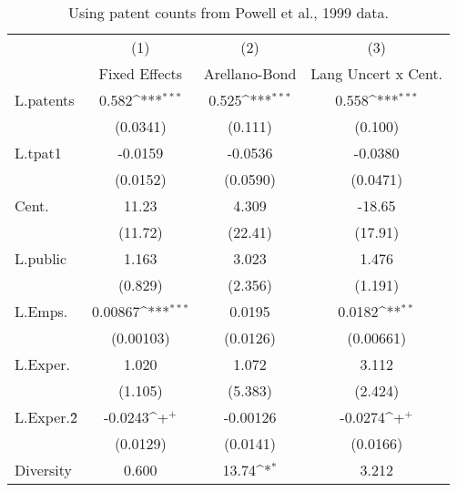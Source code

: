 \begin{table}
\begin{center}
\caption[Alternative Patents Measure]{Using patent counts from Powell et al., 1999 data.\label{altpat}}
\vspace{0.3in}
{
\def\sym#1{\ifmmode^{#1}\else\(^{#1}\)\fi}
\begin{tabular}{l*{3}{c}}
\hline\hline
                    &\multicolumn{1}{c}{(1)}&\multicolumn{1}{c}{(2)}&\multicolumn{1}{c}{(3)}\\
                    &\multicolumn{1}{c}{Fixed Effects}&\multicolumn{1}{c}{Arellano-Bond}&\multicolumn{1}{c}{Lang Uncert x Cent.}\\
\hline
L.patents           &       0.582\sym{***}&       0.525\sym{***}&       0.558\sym{***}\\
                    &    (0.0341)         &     (0.111)         &     (0.100)         \\
L.tpat1             &     -0.0159         &     -0.0536         &     -0.0380         \\
                    &    (0.0152)         &    (0.0590)         &    (0.0471)         \\
Cent.               &       11.23         &       4.309         &      -18.65         \\
                    &     (11.72)         &     (22.41)         &     (17.91)         \\
L.public            &       1.163         &       3.023         &       1.476         \\
                    &     (0.829)         &     (2.356)         &     (1.191)         \\
L.Emps.             &     0.00867\sym{***}&      0.0195         &      0.0182\sym{**} \\
                    &   (0.00103)         &    (0.0126)         &   (0.00661)         \\
L.Exper.            &       1.020         &       1.072         &       3.112         \\
                    &     (1.105)         &     (5.383)         &     (2.424)         \\
L.Exper.\^2         &     -0.0243\sym{+}  &    -0.00126         &     -0.0274\sym{+}  \\
                    &    (0.0129)         &    (0.0141)         &    (0.0166)         \\
Diversity           &       0.600         &       13.74\sym{*}  &       3.212         \\

\end{tabular}}
\end{center}
\end{table}

